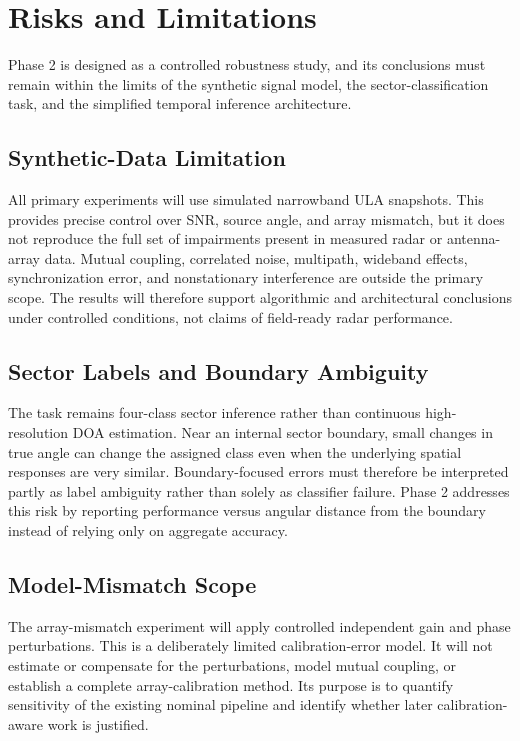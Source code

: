 \section{Risks and Limitations}

Phase 2 is designed as a controlled robustness study, and its conclusions must remain within the limits of the synthetic signal model, the sector-classification task, and the simplified temporal inference architecture.

\subsection{Synthetic-Data Limitation}

All primary experiments will use simulated narrowband ULA snapshots. This provides precise control over SNR, source angle, and array mismatch, but it does not reproduce the full set of impairments present in measured radar or antenna-array data. Mutual coupling, correlated noise, multipath, wideband effects, synchronization error, and nonstationary interference are outside the primary scope. The results will therefore support algorithmic and architectural conclusions under controlled conditions, not claims of field-ready radar performance.

\subsection{Sector Labels and Boundary Ambiguity}

The task remains four-class sector inference rather than continuous high-resolution DOA estimation. Near an internal sector boundary, small changes in true angle can change the assigned class even when the underlying spatial responses are very similar. Boundary-focused errors must therefore be interpreted partly as label ambiguity rather than solely as classifier failure. Phase 2 addresses this risk by reporting performance versus angular distance from the boundary instead of relying only on aggregate accuracy.

\subsection{Model-Mismatch Scope}

The array-mismatch experiment will apply controlled independent gain and phase perturbations. This is a deliberately limited calibration-error model. It will not estimate or compensate for the perturbations, model mutual coupling, or establish a complete array-calibration method. Its purpose is to quantify sensitivity of the existing nominal pipeline and identify whether later calibration-aware work is justified.

